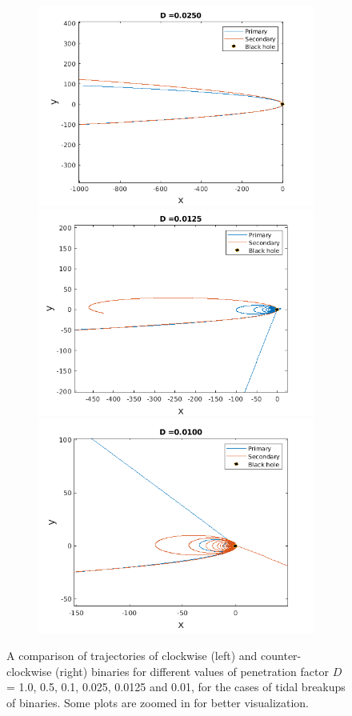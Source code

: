 \documentclass[a4paper]{article}
\begin{document}
\begin{enumerate} [label*=\textbf{(\alph*)}]
\begin{figure} [h]
\begin{subfigure} {.425\linewidth}
						\includegraphics[width=\linewidth, height =.55\linewidth] {../plots/3f/prograde_orbits/3.png}\\
						\includegraphics[width=\linewidth, height =.55\linewidth] {../plots/3f/prograde_orbits/2.png}\\
						\includegraphics[width=\linewidth, height =.55\linewidth] {../plots/3f/prograde_orbits/1.png}
					\end{subfigure}
					\caption{A comparison of trajectories of clockwise (left) and counter-clockwise (right) binaries for different values of penetration factor \(D\) = 1.0, 0.5, 0.1, 0.025, 0.0125 and 0.01, for the cases of tidal breakups of binaries. Some plots are zoomed in for better visualization.}
					\label{fig:3f-orbits_pro_retro}
				\end{figure}
			

\end{enumerate}
\end{document}
